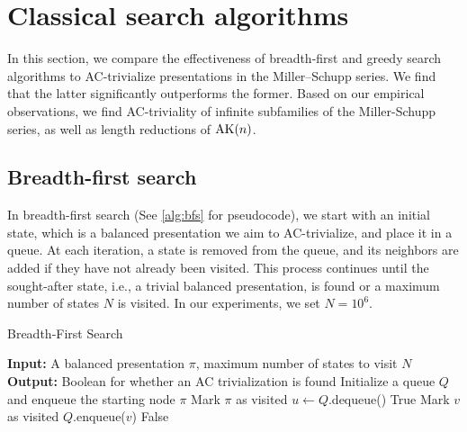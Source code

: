 
\section{Classical search algorithms}\label{sec:search}

In this section, we compare the effectiveness of breadth-first and greedy search algorithms to AC-trivialize presentations in the Miller--Schupp series.
We find that the latter significantly outperforms the former. Based on our empirical observations, we find AC-triviality of infinite subfamilies of the Miller-Schupp series, as well as length reductions of $\text{AK}(n)$. 

\subsection{Breadth-first search}

In breadth-first search (See \cref{alg:bfs} for pseudocode), we start with an initial state, which is a balanced presentation we aim to AC-trivialize, and place it in a queue. At each iteration, a state is removed from the queue, and its neighbors are added if they have not already been visited. This process continues until the sought-after state, i.e., a trivial balanced presentation, is found or a maximum number of states $N$ is visited. In our experiments, we set $N = 10^6$.

\begin{algorithm}
	\caption{Breadth-First Search}\label{alg:bfs}
	\begin{algorithmic}[1] %
		\State \textbf{Input:} A balanced presentation $\pi$, maximum number of states to visit $N$
		\State \textbf{Output:} Boolean for whether an AC trivialization is found
		\State Initialize a queue $Q$ and enqueue the starting node $\pi$
		\State Mark $\pi$ as visited
		\State $u \gets Q$.dequeue() 
		\State \Return True 
		\EndIf
		\State Mark $v$ as visited
		\State $Q$.enqueue($v$) 
		\EndIf
		\EndFor
		\EndWhile
		\State \Return False 
	\end{algorithmic}
\end{algorithm}

